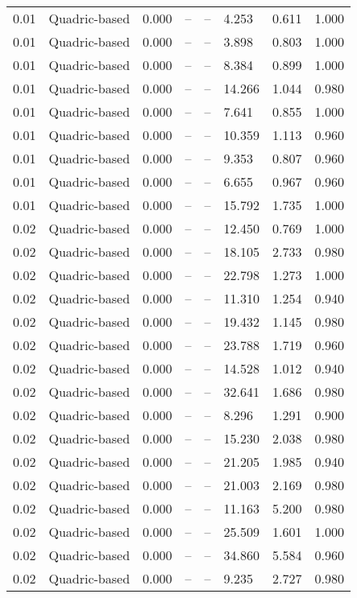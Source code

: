 \begin{table}[H]
\begin{tabular}{l c l l l}
0.01 & Quadric-based & 0.000 & -- & -- & 4.253 & 0.611 & 1.000 \\
0.01 & Quadric-based & 0.000 & -- & -- & 3.898 & 0.803 & 1.000 \\
0.01 & Quadric-based & 0.000 & -- & -- & 8.384 & 0.899 & 1.000 \\
0.01 & Quadric-based & 0.000 & -- & -- & 14.266 & 1.044 & 0.980 \\
0.01 & Quadric-based & 0.000 & -- & -- & 7.641 & 0.855 & 1.000 \\
0.01 & Quadric-based & 0.000 & -- & -- & 10.359 & 1.113 & 0.960 \\
0.01 & Quadric-based & 0.000 & -- & -- & 9.353 & 0.807 & 0.960 \\
0.01 & Quadric-based & 0.000 & -- & -- & 6.655 & 0.967 & 0.960 \\
0.01 & Quadric-based & 0.000 & -- & -- & 15.792 & 1.735 & 1.000 \\
0.02 & Quadric-based & 0.000 & -- & -- & 12.450 & 0.769 & 1.000 \\
0.02 & Quadric-based & 0.000 & -- & -- & 18.105 & 2.733 & 0.980 \\
0.02 & Quadric-based & 0.000 & -- & -- & 22.798 & 1.273 & 1.000 \\
0.02 & Quadric-based & 0.000 & -- & -- & 11.310 & 1.254 & 0.940 \\
0.02 & Quadric-based & 0.000 & -- & -- & 19.432 & 1.145 & 0.980 \\
0.02 & Quadric-based & 0.000 & -- & -- & 23.788 & 1.719 & 0.960 \\
0.02 & Quadric-based & 0.000 & -- & -- & 14.528 & 1.012 & 0.940 \\
0.02 & Quadric-based & 0.000 & -- & -- & 32.641 & 1.686 & 0.980 \\
0.02 & Quadric-based & 0.000 & -- & -- & 8.296 & 1.291 & 0.900 \\
0.02 & Quadric-based & 0.000 & -- & -- & 15.230 & 2.038 & 0.980 \\
0.02 & Quadric-based & 0.000 & -- & -- & 21.205 & 1.985 & 0.940 \\
0.02 & Quadric-based & 0.000 & -- & -- & 21.003 & 2.169 & 0.980 \\
0.02 & Quadric-based & 0.000 & -- & -- & 11.163 & 5.200 & 0.980 \\
0.02 & Quadric-based & 0.000 & -- & -- & 25.509 & 1.601 & 1.000 \\
0.02 & Quadric-based & 0.000 & -- & -- & 34.860 & 5.584 & 0.960 \\
0.02 & Quadric-based & 0.000 & -- & -- & 9.235 & 2.727 & 0.980 \\

\end{tabular}
\end{table}
